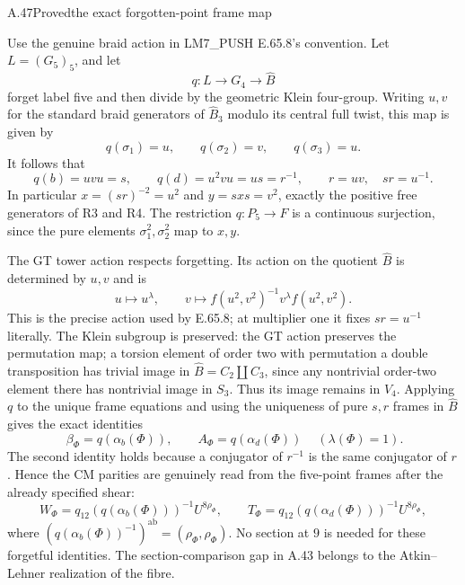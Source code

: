 \begin{statement}{A.47}{Proved}{the exact forgotten-point frame map}
\end{statement}
Use the genuine braid action in LM7\_PUSH E.65.8's convention. Let
$L=(G_5)_5$, and let
\[
 q:L\longrightarrow G_4\longrightarrow\widehat B
\]
forget label five and then divide by the geometric Klein four-group.
Writing $u,v$ for the standard braid generators of $\widehat B_3$ modulo
its central full twist, this map is given by
\[
 q(\sigma_1)=u,\qquad q(\sigma_2)=v,\qquad q(\sigma_3)=u.
\]
It follows that
\[
 q(b)=uvu=s,\qquad q(d)=u^2vu=u s=r^{-1},\qquad
 r=uv,\quad sr=u^{-1}.
\]
In particular $x=(sr)^{-2}=u^2$ and $y=sxs=v^2$, exactly the positive
free generators of R3 and R4. The restriction $q:P_5\to F$ is a
continuous surjection, since the pure elements $\sigma_1^2,\sigma_2^2$
map to $x,y$.

The GT tower action respects forgetting. Its action on the quotient
$\widehat B$ is determined by $u,v$ and is
\[
 u\longmapsto u^\lambda,\qquad
 v\longmapsto f(u^2,v^2)^{-1}v^\lambda f(u^2,v^2).
\]
This is the precise action used by E.65.8; at multiplier one it fixes
$sr=u^{-1}$ literally. The Klein subgroup is preserved: the GT action
preserves the permutation map; a torsion element of order two with
permutation a double transposition has trivial image in
$\widehat B=C_2\amalg C_3$, since any nontrivial order-two element there
has nontrivial image in $S_3$. Thus its image remains in $V_4$.
Applying $q$ to the unique frame equations and using the uniqueness of
pure $s,r$ frames in $\widehat B$ gives the exact identities
\[
 \boxed{\ \beta_\Phi=q(\alpha_b(\Phi)),\qquad
 A_\Phi=q(\alpha_d(\Phi))\ }
 \quad(\lambda(\Phi)=1).
\]
The second identity holds because a conjugator of $r^{-1}$ is the same
conjugator of $r$. Hence the CM parities are genuinely read from the
five-point frames after the already specified shear:
\[
 W_\Phi=q_{12}(q(\alpha_b(\Phi)))^{-1}U^{8\rho_\Phi},\qquad
 T_\Phi=q_{12}(q(\alpha_d(\Phi)))^{-1}U^{8\rho_\Phi},
\]
where $(q(\alpha_b(\Phi))^{-1})^{\mathrm{ab}}
=(\rho_\Phi,\rho_\Phi)$. No section at $9$ is needed for these
forgetful identities. The section-comparison gap in A.43 belongs to
the Atkin--Lehner realization of the fibre.

